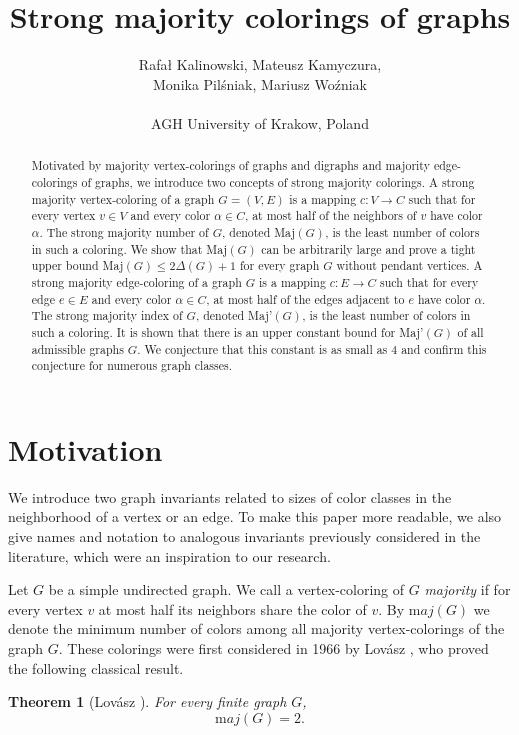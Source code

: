 \documentclass[11pt]{article}
\title{Strong majority colorings of graphs}
\author{Rafa{\l} Kalinowski, Mateusz Kamyczura, \\ Monika Pil\'sniak, Mariusz Wo{\'z}niak \\\mbox{ }\\
AGH University of Krakow,  Poland
}
\date{}
\newtheorem{theorem}{Theorem}
\begin{document}
\maketitle

\begin{abstract}
Motivated by majority vertex-colorings of graphs and digraphs and majority edge-colorings of graphs, we introduce two concepts of strong majority colorings. A strong majority vertex-coloring of a graph $G=(V,E)$ is a mapping $c:V\rightarrow C$ such that for every vertex $v\in V$ and every color $\alpha\in C$, at most half of the neighbors of $v$ have color $\alpha$. The strong majority number of $G$, denoted Maj$(G)$, is the least number of colors in such a coloring. We show that Maj$(G)$ can be arbitrarily large and prove a tight upper bound Maj$(G)\le 2\Delta(G)+1$ for every graph $G$ without pendant vertices. A strong majority edge-coloring of a graph $G$ is a mapping $c:E\rightarrow C$ such that for every edge $e\in E$ and every color $\alpha\in C$, at most half of the edges adjacent to $e$ have color $\alpha$. The strong majority index of $G$, denoted Maj'$(G)$, is the least number of colors in such a coloring. It is shown that there is an upper constant bound for Maj'$(G)$ of all admissible graphs $G$. We conjecture that this constant is as small as 4 and confirm this conjecture for numerous graph classes.
\end{abstract}




\section{Motivation}

We introduce two graph invariants related to sizes of color classes in the neighborhood of a vertex or an edge. To make this paper more readable, we also give names and notation to analogous invariants previously considered in the literature, which were an inspiration to our research. 

Let $G$ be a simple undirected graph. We call a vertex-coloring of $G$ {\it majority} if for every vertex $v$ at most half its neighbors share the color of $v$. By ${\mathrm maj}(G)$ we denote the minimum number of colors among all majority vertex-colorings of the graph $G$. These colorings were first considered in 1966 by Lov\'asz \cite{Lov66}, who proved the following classical result.

\begin{theorem} [Lov\'asz \cite{Lov66}]\label{Lov}
For every finite graph $G$, $${\mathrm maj}(G)=2.$$   
\end{theorem}
\end{document}
